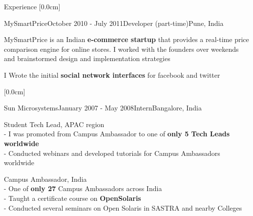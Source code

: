 \documentclass{resume} %
\begin{document}
\begin{rSection}{Experience}
[0.0cm]
\begin{rSubsection}{MySmartPrice}{October 2010 - July 2011}{Developer (part-time)}{Pune, India}
\item MySmartPrice is an Indian \textbf{e-commerce startup} that provides a real-time price comparison engine for online stores. 
I worked with the founders over weekends and brainstormed design and implementation strategies
\item I Wrote the initial \textbf{social network interfaces} for facebook and twitter 
\end{rSubsection}

[0.0cm]
\begin{rSubsection}{Sun Microsystems}{January 2007 - May 2008}{Intern}{Bangalore, India}
\item Student Tech Lead, APAC region \\
- I was promoted from Campus Ambassador to one of \textbf{only 5 Tech Leads worldwide}\\
- Conducted webinars and developed tutorials for Campus Ambassadors worldwide
\item Campus Ambassador, India \\
- One of \textbf{only 27} Campus Ambassadors across India\\
- Taught a certificate course on \textbf{OpenSolaris}\\
- Conducted several seminars on Open Solaris in SASTRA and nearby Colleges
\end{rSubsection}

\end{rSection}



\end{document}
